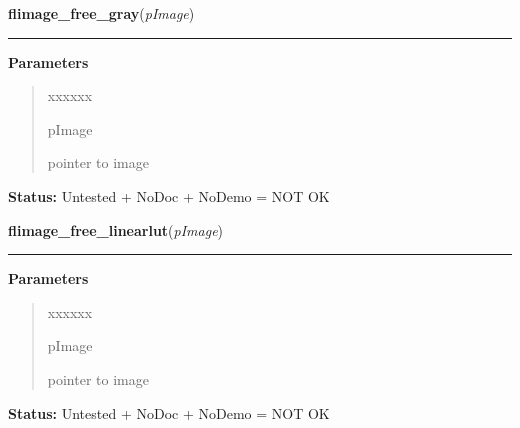 \hspace{.8\funcindent}\begin{boxedminipage}{\funcwidth}

    \raggedright \textbf{flimage\_free\_gray}(\textit{pImage})

    \vspace{-1.5ex}

    \rule{\textwidth}{0.5\fboxrule}
\setlength{\parskip}{2ex}
\setlength{\parskip}{1ex}
      \textbf{Parameters}
      \vspace{-1ex}

      \begin{quote}
        \begin{Ventry}{xxxxxx}

          \item[pImage]

          pointer to image

        \end{Ventry}

      \end{quote}

\textbf{Status:} Untested + NoDoc + NoDemo = NOT OK



    \end{boxedminipage}

    \label{xformslib:library:flimage_free_linearlut}

    \vspace{0.5ex}

\hspace{.8\funcindent}\begin{boxedminipage}{\funcwidth}

    \raggedright \textbf{flimage\_free\_linearlut}(\textit{pImage})

    \vspace{-1.5ex}

    \rule{\textwidth}{0.5\fboxrule}
\setlength{\parskip}{2ex}
\setlength{\parskip}{1ex}
      \textbf{Parameters}
      \vspace{-1ex}

      \begin{quote}
        \begin{Ventry}{xxxxxx}

          \item[pImage]

          pointer to image

        \end{Ventry}

      \end{quote}

\textbf{Status:} Untested + NoDoc + NoDemo = NOT OK



    \end{boxedminipage}

